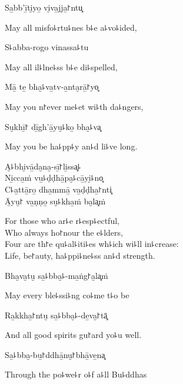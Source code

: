 Sa̱bb'ī̱ti̮yo̱ vi̮va̱jja̱꜓ntu͓

\begin{english}
  May all misfo꜕rtu꜕nes b꜕e a꜕vo꜕ided,
\end{english}

S꜕abba-rogo vinassa꜕tu

\begin{english}
  May all il꜕lne꜕ss b꜕e di꜕spelled,
\end{english}

Mā̱ te̱ bha̮꜕va̱tv-a̱nta̮rā̱꜓yo͓

\begin{english}
  May you n꜓ever me꜕et wi꜕th da꜕ngers,
\end{english}

Su̮khī̱꜓ dī̱gh'ā̱yu̮꜕ko̱ bha̮꜕va͓

\begin{english}
  May you be ha꜕pp꜕y an꜕d li꜕ve long.
\end{english}

A̮꜕bhi̮vā̱da̮na̮-sī̱꜓li̱ssa͓꜕\\
Ni̱cca̱ṁ vu̱꜕ḍḍhā̱pa̮꜕cā̱yi̮꜕no͓\\
C꜕a̱ttā̱ro̱ dha̱mmā̱ va̱ḍḍha̱꜓nti͓\\
Ā̱yu̮꜓ va̱ṇṇo̱ su̮꜕kha̱ṁ ba̮la͓ṁ

\begin{english}
  For those who ar꜕e r꜕esp꜕ectful,\\
  Who always ho꜓nour the e꜕lders,\\
  Four are th꜓e qu꜕al꜕iti꜕es wh꜕ich wi꜕ll in꜕crease:\\
  Life, be꜓auty, ha꜕ppi꜕ne꜕ss an꜕d strength.
\end{english}

Bha̮va̮tu̮ sa̱꜕bba̮꜕-ma̱ṅg꜓a̮la͓ṁ

\begin{english}
  May every ble꜕ssi꜕ng co꜕me t꜕o be
\end{english}

Ra̱kkha̱꜓ntu̮ sa̱꜕bba̮꜕-de̱va̮꜓tā͓

\begin{english}
  And all good spirits gu꜓ard yo꜕u well.
\end{english}

Sa̱꜕bba̮-bu̱꜓ddhā̱nu̮꜓bhā̱ve̱na͓

\begin{english}
  Through the po꜕we꜕r o꜕f a꜕ll Bu꜕ddhas
\end{english}

